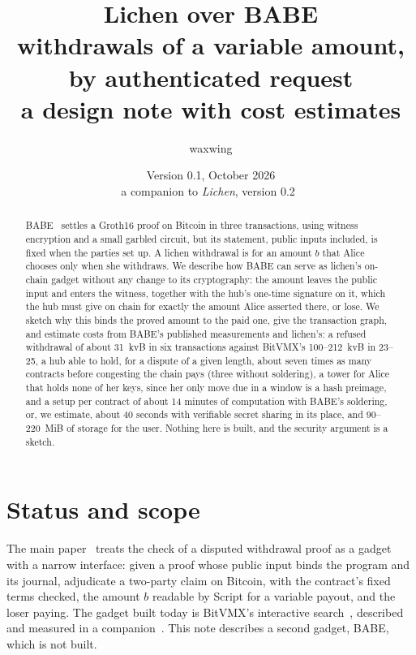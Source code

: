 \documentclass[11pt]{article}
\title{\textbf{Lichen over BABE}\\withdrawals of a variable amount, by authenticated request\\[2pt]\large a design note with cost estimates}
\author{waxwing}
\date{Version 0.1, October 2026\\[2pt]\small a companion to \emph{Lichen}, version 0.2~\cite{lichen}}
\begin{document}
\maketitle

\begin{abstract}
BABE~\cite{babe} settles a Groth16 proof on Bitcoin in three
transactions, using witness encryption and a small garbled circuit, but
its statement, public inputs included, is fixed when the parties set up.
A lichen withdrawal is for an amount $b$ that Alice chooses only when she
withdraws. We describe how BABE can serve as lichen's on-chain gadget
without any change to its cryptography: the amount leaves the public
input and enters the witness, together with the hub's one-time signature
on it, which the hub must give on chain for exactly the amount Alice
asserted there, or lose. We sketch why this binds the proved amount to
the paid one, give the transaction graph, and estimate costs from BABE's
published measurements and lichen's: a refused withdrawal of about
31~kvB in six transactions against BitVMX's 100--212~kvB in 23--25, a
hub able to hold, for a dispute of a given length, about seven times as
many contracts before congesting the chain pays (three without
soldering), a
tower for Alice that holds none of her keys, since her only move due in
a window is a hash preimage, and a
setup per contract of about 14 minutes of computation with BABE's
soldering, or, we estimate, about 40 seconds with verifiable secret
sharing in its place, and 90--220~MiB of storage for the user. Nothing here is built, and the security argument is a
sketch.
\end{abstract}

\tableofcontents

\section{Status and scope}
\label{sec:status}

The main paper~\cite{lichen} treats the check of a disputed withdrawal
proof as a gadget with a narrow interface: given a proof whose public
input binds the program and its journal, adjudicate a two-party claim
on Bitcoin, with the contract's fixed terms checked, the amount $b$
readable by Script for a variable payout, and the loser paying. The
gadget built today is BitVMX's interactive search~\cite{bitvmx},
described and measured in a companion~\cite{lichenbitvmx}. This note
describes a second gadget, BABE, which is not built.
\end{document}
